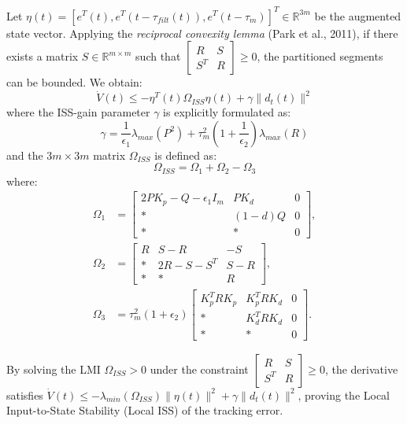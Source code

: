 \documentclass[letterpaper,journal]{IEEEtran}
\begin{document}
Let $\eta(t) = [e^T(t), e^T(t-\tau_{filt}(t)), e^T(t-\tau_m)]^T \in \mathbb{R}^{3m}$ be the augmented state vector. Applying the \textit{reciprocal convexity lemma} (Park et al., 2011), if there exists a matrix $S \in \mathbb{R}^{m \times m}$ such that $\begin{bmatrix} R & S \\ S^T & R \end{bmatrix} \ge 0$, the partitioned segments can be bounded. We obtain:
\begin{equation}
\dot{V}(t) \le -\eta^T(t) \Omega_{ISS} \eta(t) + \gamma \|d_t(t)\|^2
\end{equation}
where the ISS-gain parameter $\gamma$ is explicitly formulated as:
\begin{equation}
\gamma = \frac{1}{\epsilon_1}\lambda_{max}(P^2) + \tau_m^2 \left( 1 + \frac{1}{\epsilon_2} \right) \lambda_{max}(R)
\end{equation}
and the $3m \times 3m$ matrix $\Omega_{ISS}$ is defined as:
\begin{equation}
\Omega_{ISS} = \Omega_1 + \Omega_2 - \Omega_3
\end{equation}
where:
\begin{align*}
\Omega_1 &= \begin{bmatrix} 2 P K_p - Q - \epsilon_1 I_m & P K_d & 0 \\ * & (1-d)Q & 0 \\ * & * & 0 \end{bmatrix}, \\
\Omega_2 &= \begin{bmatrix} R & S-R & -S \\ * & 2R-S-S^T & S-R \\ * & * & R \end{bmatrix}, \\
\Omega_3 &= \tau_m^2 (1 + \epsilon_2) \begin{bmatrix} K_p^T R K_p & K_p^T R K_d & 0 \\ * & K_d^T R K_d & 0 \\ * & * & 0 \end{bmatrix}.
\end{align*}

By solving the LMI $\Omega_{ISS} > 0$ under the constraint $\begin{bmatrix} R & S \\ S^T & R \end{bmatrix} \ge 0$, the derivative satisfies $\dot{V}(t) \le -\lambda_{min}(\Omega_{ISS}) \|\eta(t)\|^2 + \gamma \|d_t(t)\|^2$, proving the Local Input-to-State Stability (Local ISS) of the tracking error.
\end{document}
